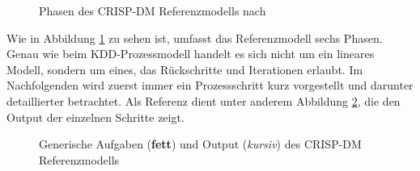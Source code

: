 \begin{figure}[H]
\centering
{}
\caption{Phasen des CRISP-DM Referenzmodells nach \citep[S.~10]{chapman_crisp-dm_2000}}
\label{fig:CRISP_DM}
\end{figure}

Wie in Abbildung \ref{fig:CRISP_DM} zu sehen ist, umfasst das Referenzmodell sechs Phasen. Genau wie beim KDD-Prozessmodell handelt es sich nicht um ein lineares Modell, sondern um eines, das Rückschritte und Iterationen erlaubt. Im Nachfolgenden wird zuerst immer ein Prozessschritt kurz vorgestellt und darunter detaillierter betrachtet. Als Referenz dient unter anderem Abbildung \ref{fig:CRISP_DM_detailed}, die den Output der einzelnen Schritte zeigt.

\begin{figure}[H]
\centering
{}
\caption{Generische Aufgaben (\textbf{fett}) und Output (\textit{kursiv}) des CRISP-DM Referenzmodells \citep[S.~12]{chapman_crisp-dm_2000}}
\label{fig:CRISP_DM_detailed}
\end{figure}

